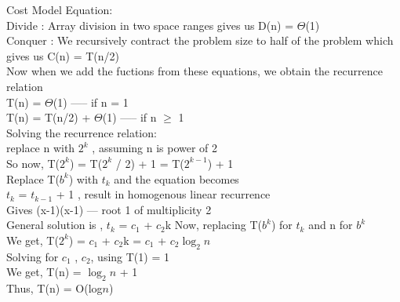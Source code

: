 \documentclass[11pt]{article}
\begin{document}
\begin{questions}
\begin{solutionorbox}
Cost Model Equation:\\ 
Divide : Array division in two space ranges gives us D(n) = $\Theta$(1)\\
Conquer : We recursively contract the problem size to half of the problem which gives us C(n) = T(n/2)\\
Now when we add the fuctions from these equations, we obtain the recurrence relation\\
T(n) = $\Theta$(1) ----- if n = 1  \\
T(n) = T(n/2) + $\Theta$(1) -----  if n $\geq$ 1   \\ 
 
Solving the recurrence relation: \\
replace n with $2^k$ , assuming n is power of 2 \\
So now, T($2^k$) =  T($2^k$ / 2) + 1 = T($2^{k-1}$) + 1 \\
Replace T($b^k$) with $t_k$ and the equation becomes \\
$t_k$ = $t_{k-1}$ + 1 , result in homogenous linear recurrence\\
Gives (x-1)(x-1) --- root 1 of multiplicity 2 \\
General solution is , $t_k$ = $c_1$ + $c_2$k
Now, replacing  T($b^k$) for $t_k$ and n for $b^k$ \\
We get, T($2^k$) =  $c_1$ + $c_2$k = $c_1$  + $c_2$$\log _{2} n$ \\
Solving for  $c_1$ , $c_2$, using T(1) = 1 \\
We get, T(n) = $\log _{2} n$ + 1 \\
Thus, T(n) = O(log$n$)

\end{solutionorbox}

\ifprintanswers
\newpage
\else
\bigskip
\fi



\end{questions}
\end{document}
